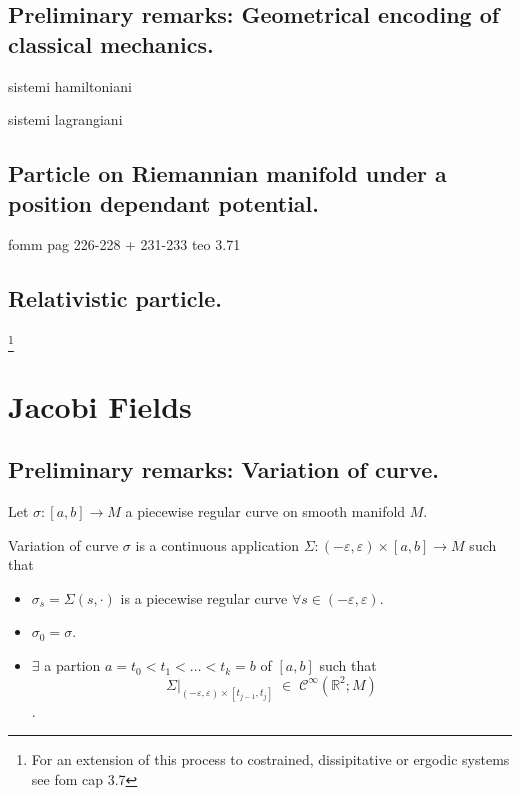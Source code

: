 \documentclass[a4paper,12pt]{scrartcl}    %
\begin{document}
\subsection{Preliminary remarks: Geometrical encoding of classical mechanics.}
    sistemi hamiltoniani

    sistemi lagrangiani
    
\subsection{Particle on Riemannian manifold under a position dependant potential.}	
	fomm pag 226-228 + 231-233       teo 3.71
 
    
    
\subsection{Relativistic particle.}


	\footnote{For an extension of this process to costrained, dissipitative or ergodic systems see fom cap 3.7}


\newpage
\section{Jacobi Fields}

\subsection{Preliminary remarks: Variation of curve.}
Let $\sigma:[a,b]\rightarrow M$ a piecewise regular curve on smooth manifold $M$.

 \begin{definition}
  Variation of curve $\sigma$ is a continuous application $\Sigma: (-\varepsilon, \varepsilon) \times [a,b] \rightarrow M$ such that
  \begin{itemize}
   \item $\sigma_s = \Sigma(s, \cdot)$ is a piecewise regular curve $\forall s \in  (-\varepsilon, \varepsilon)$.
   \item $\sigma_0 = \sigma$.
   \item $\exists$ a partion $ a= t_0 < t_1 < \ldots < t_k=b$ of $[a,b]$ such that 
   $$ \Sigma \big \vert_{(-\varepsilon, \varepsilon) \times [t_{j-1},t_{j}]}\; \in \; \mathcal{C}^\infty(\mathbb{R}^2; M)$$.
  \end{itemize}
 \end{definition}
 
\end{document}
